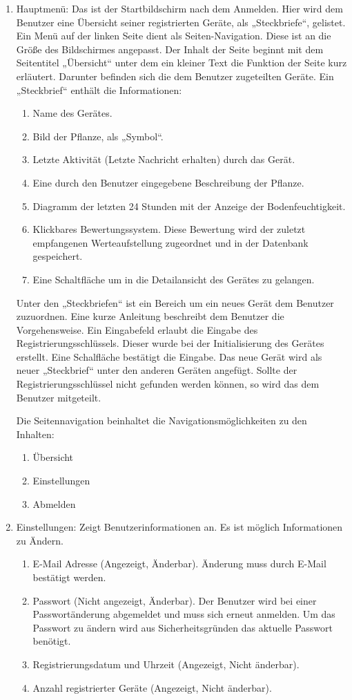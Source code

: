\documentclass[pointlessnumbers]{scrartcl}
\begin{document}
\begin{enumerate}
\item Hauptmenü: Das ist der Startbildschirm nach dem Anmelden. Hier wird dem Benutzer eine Übersicht seiner registrierten Geräte, als „Steckbriefe“, gelistet. Ein Menü auf der linken Seite dient als Seiten-Navigation. Diese ist an die Größe des Bildschirmes angepasst. Der Inhalt der Seite beginnt mit dem Seitentitel „Übersicht“ unter dem ein kleiner Text die Funktion der Seite kurz erläutert. Darunter befinden sich die dem Benutzer zugeteilten Geräte. Ein „Steckbrief“ enthält die Informationen:
\begin{enumerate}
    \item Name des Gerätes.
    \item Bild der Pflanze, als „Symbol“.
    \item Letzte Aktivität (Letzte Nachricht erhalten) durch das Gerät.
    \item Eine durch den Benutzer eingegebene Beschreibung der Pflanze.
    \item Diagramm der letzten 24 Stunden mit der Anzeige der Bodenfeuchtigkeit.
    \item Klickbares Bewertungssystem. Diese Bewertung wird der zuletzt empfangenen Werteaufstellung zugeordnet und in der Datenbank gespeichert.
    \item Eine Schaltfläche um in die Detailansicht des Gerätes zu gelangen.
\end{enumerate}

Unter den „Steckbriefen“ ist ein Bereich um ein neues Gerät dem Benutzer zuzuordnen. Eine kurze Anleitung beschreibt dem Benutzer die Vorgehensweise. Ein Eingabefeld erlaubt die Eingabe des Registrierungsschlüssels. Dieser wurde bei der Initialisierung des Gerätes erstellt. Eine Schalfläche bestätigt die Eingabe. Das neue Gerät wird als neuer „Steckbrief“ unter den anderen Geräten angefügt. Sollte der Registrierungsschlüssel nicht gefunden werden können, so wird das dem Benutzer mitgeteilt.

Die Seitennavigation beinhaltet die Navigationsmöglichkeiten zu den Inhalten:
\begin{enumerate}
    \item Übersicht
    \item Einstellungen
    \item Abmelden 
\end{enumerate}

\item Einstellungen: Zeigt Benutzerinformationen an. Es ist möglich Informationen zu Ändern.
\begin{enumerate}
    \item E-Mail Adresse (Angezeigt, Änderbar). Änderung muss durch E-Mail bestätigt werden.
    \item Passwort (Nicht angezeigt, Änderbar). Der Benutzer wird bei einer Passwortänderung abgemeldet und muss sich erneut anmelden. Um das Passwort zu ändern wird aus Sicherheitsgründen das aktuelle Passwort benötigt.
    \item Registrierungsdatum und Uhrzeit (Angezeigt, Nicht änderbar).
    \item Anzahl registrierter Geräte (Angezeigt, Nicht änderbar). 
\end{enumerate}


\end{enumerate}
\end{document}
